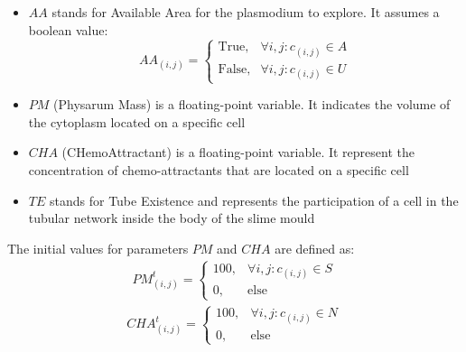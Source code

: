 \begin{itemize}
	\item $AA$ stands for Available Area for the plasmodium to explore. It assumes a boolean value:  	
\[AA_{(i, j)}=\begin{cases} \mbox{True}, & \forall i, j: c_{(i,j)} \in A \\ \mbox{False}, &  \forall i, j: c_{(i,j)} \in U\end{cases}\]
	\item $PM$ (Physarum Mass) is a floating-point variable. It indicates the volume of the cytoplasm located on a specific cell
	\item $CHA$ (CHemoAttractant) is a floating-point variable. It represent the concentration of chemo-attractants that are located on a specific cell
	\item $TE$ stands for Tube Existence and represents the participation of a cell in the tubular network inside the body of the slime mould
\end{itemize}

The initial values for parameters $PM$ and $CHA$ are defined as:
\begin{align}
PM^t_{(i, j)}=\begin{cases} 100, & \forall i, j: c_{(i,j)} \in S \\ 0, & \mbox{else}\end{cases}
\end{align}
\begin{align}
CHA^t_{(i, j)}=\begin{cases} 100, & \forall i, j: c_{(i,j)} \in N \\ 0, & \mbox{else}\end{cases}
\end{align}

